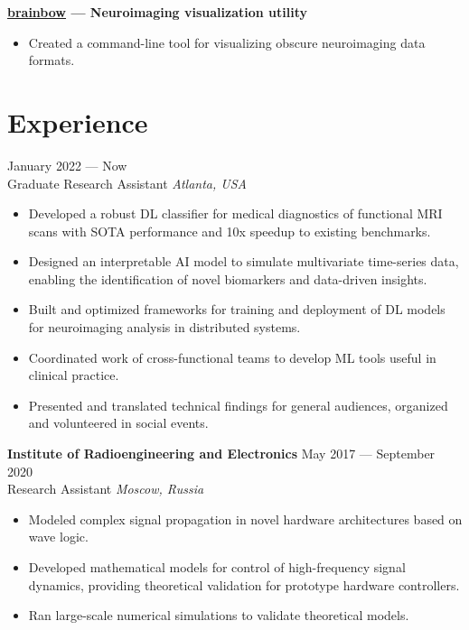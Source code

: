 \documentclass[11pt,a4paper]{article}
\begin{document}
\noindent\textbf{\href{https://pypi.org/project/brainbow/}{brainbow} — Neuroimaging visualization utility}\\
[-2em]
\begin{itemize}[leftmargin=*,noitemsep]
    \item Created a command-line tool for visualizing obscure neuroimaging data formats.
\end{itemize}

\section*{Experience}
 \hfill January 2022 --- Now\\
Graduate Research Assistant \hfill \textit{Atlanta, USA}\\
[-2em]
\begin{itemize}[leftmargin=*,noitemsep]
    \item Developed a robust DL classifier for medical diagnostics of functional MRI scans with SOTA performance and 10x speedup to existing benchmarks.
    \item Designed an interpretable AI model to simulate multivariate time-series data, enabling the identification of novel biomarkers and data-driven insights.
    \item Built and optimized frameworks for training and deployment of DL models for neuroimaging analysis in distributed systems.
    \item Coordinated work of cross-functional teams to develop ML tools useful in clinical practice.
    \item Presented and translated technical findings for general audiences, organized and volunteered in social events.
\end{itemize}

\noindent\textbf{Institute of Radioengineering and Electronics} \hfill May 2017 --- September 2020\\
Research Assistant \hfill \textit{Moscow, Russia}\\
[-2em]
\begin{itemize}[leftmargin=*,noitemsep]
    \item Modeled complex signal propagation in novel hardware architectures based on wave logic.
    \item Developed mathematical models for control of high-frequency signal dynamics, providing theoretical validation for prototype hardware controllers.
    \item Ran large-scale numerical simulations to validate theoretical models.
\end{itemize}
\end{document}
